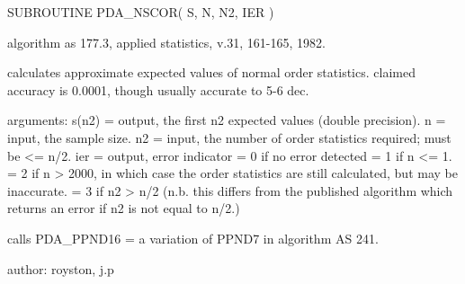 \documentclass[11pt,twoside,nolof]{starlink}
\begin{document}
\begin{terminalv}
     SUBROUTINE PDA_NSCOR( S, N, N2, IER )

     algorithm as 177.3, applied statistics, v.31, 161-165, 1982.

     calculates approximate expected values of normal order statistics.
     claimed accuracy is 0.0001, though usually accurate to 5-6 dec.

     arguments:
     s(n2)   = output, the first n2 expected values (double precision).
     n       = input, the sample size.
     n2      = input, the number of order statistics required; must
                      be <= n/2.
     ier     = output, error indicator
                   = 0 if no error detected
                   = 1 if n <= 1.
                   = 2 if n > 2000, in which case the order statistics
                          are still calculated, but may be inaccurate.
                   = 3 if n2 > n/2 (n.b. this differs from the
                          published algorithm which returns an error
                          if n2 is not equal to n/2.)

     calls PDA_PPND16 = a variation of PPND7 in algorithm AS 241.

   author: royston, j.p

\end{terminalv}

\end{document}
